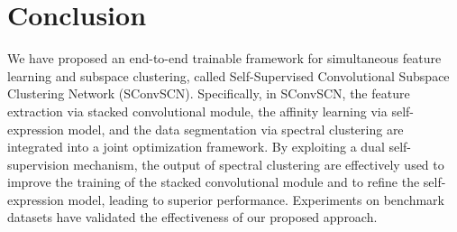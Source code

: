 \documentclass[10pt,twocolumn,letterpaper]{article}
\begin{document}
\begin{table}[htbp]
\centering
\scriptsize
{}
\caption{Clustering Error (\%) on ORL, COIL20 and COIL100.} \label{Table:acc-for-orl-and-coil}
\end{table}



\section{Conclusion}
\label{sec:conclusion}
We have proposed an end-to-end trainable framework for simultaneous feature learning and subspace clustering, called Self-Supervised Convolutional Subspace Clustering Network (SConvSCN). Specifically, in SConvSCN, the feature extraction via stacked convolutional module, the affinity learning via self-expression model, and the data segmentation via spectral clustering are integrated into a joint optimization framework. By exploiting a dual self-supervision mechanism, the output of spectral clustering are effectively used to improve the training of the stacked convolutional module and to refine the self-expression model, leading to superior performance. Experiments on benchmark datasets have validated the effectiveness of our proposed approach.
\end{document}
